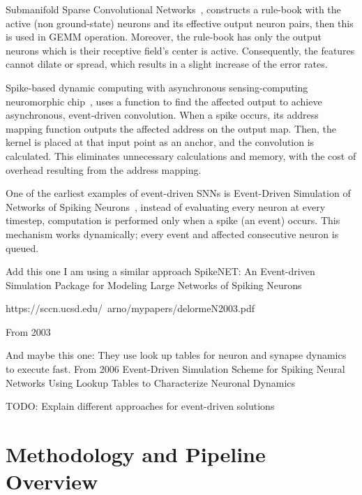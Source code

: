 \documentclass[11pt,a4paper]{article}
\begin{document}
Submanifold Sparse Convolutional Networks~\cite{graham2017submanifold}, 
constructs a rule-book with the active (non ground-state) neurons and its effective output neuron pairs, then this is used in GEMM operation. 
Moreover, the rule-book has only the output neurons which is their receptive field's center is active.
Consequently, the features cannot dilate or spread, which results in a slight increase of the error rates.

Spike-based dynamic computing with asynchronous sensing-computing neuromorphic chip~\cite{yao2024spike},
uses a function to find the affected output to achieve asynchronous, event-driven convolution.
When a spike occurs, its address mapping function outputs the affected address on the output map.
Then, the kernel is placed at that input point as an anchor, and the convolution is calculated.
This eliminates unnecessary calculations and memory, with the cost of overhead resulting from the address mapping.



One of the earliest examples of event-driven SNNs is Event-Driven Simulation of Networks of Spiking Neurons~\cite{watts1993neurips-eventdriven},
instead of evaluating every neuron at every timestep, computation is performed only when a spike (an event) occurs.
This mechanism works dynamically; every event and affected consecutive neuron is queued.

 

Add this one 
I am using a similar approach
SpikeNET: An Event-driven Simulation Package for Modeling Large Networks of Spiking Neurons  

https://sccn.ucsd.edu/~arno/mypapers/delormeN2003.pdf 

From 2003 

And maybe this one:
They use look up tables for neuron and synapse dynamics to execute fast. 
From 2006 
Event-Driven Simulation Scheme for Spiking Neural
Networks Using Lookup Tables to Characterize Neuronal
Dynamics


 

TODO: Explain different approaches for event-driven solutions 

\section{Methodology and Pipeline Overview}
\end{document}
